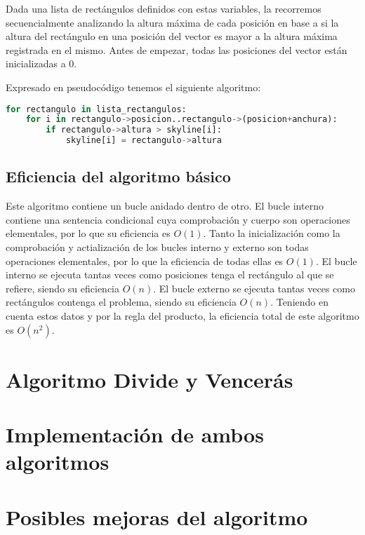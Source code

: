 Dada una lista de rectángulos definidos con estas variables, la recorremos secuencialmente analizando la altura máxima de cada posición en base a si la altura del rectángulo en una posición del vector  es mayor a la altura máxima registrada en el mismo.
Antes de empezar, todas las posiciones del vector están inicializadas a $0$.

Expresado en pseudocódigo tenemos el siguiente algoritmo:

\begin{lstlisting}[language = Python]
for rectangulo in lista_rectangulos:
	for i in rectangulo->posicion..rectangulo->(posicion+anchura):
		if rectangulo->altura > skyline[i]:
			skyline[i] = rectangulo->altura
\end{lstlisting}

\subsection{Eficiencia del algoritmo básico}

Este algoritmo contiene un bucle anidado dentro de otro.
El bucle interno contiene una sentencia condicional cuya comprobación y cuerpo son operaciones elementales, por lo que su eficiencia es $O(1)$.
Tanto la inicialización como la comprobación y actialización de los bucles interno y externo son todas operaciones elementales, por lo que la eficiencia de todas ellas es $O(1)$.
El bucle interno se ejecuta tantas veces como posiciones tenga el rectángulo al que se refiere, siendo su eficiencia $O(n)$.
El bucle externo se ejecuta tantas veces como rectángulos contenga el problema, siendo su eficiencia $O(n)$.
Teniendo en cuenta estos datos y por la regla del producto, la eficiencia total de este algoritmo es $O(n^2)$.

\section{Algoritmo Divide y Vencerás}

\section{Implementación de ambos algoritmos}

\section{Posibles mejoras del algoritmo}
